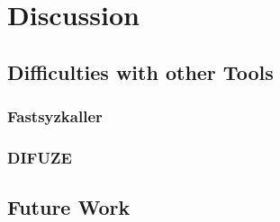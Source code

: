 \section{Discussion}




\subsection{Difficulties with other Tools}


\subsubsection{Fastsyzkaller}




\subsubsection{DIFUZE}


\subsection{Future Work}
